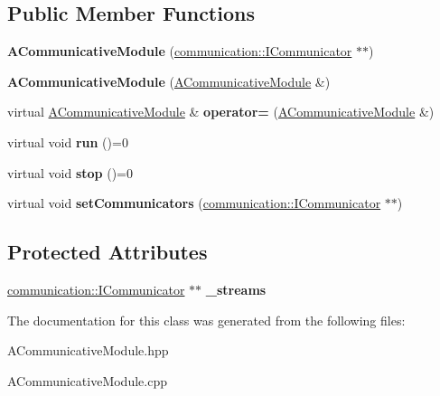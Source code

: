 \subsection*{Public Member Functions}
\begin{DoxyCompactItemize}
\item 
\mbox{\label{classwood_box_1_1module_1_1_a_communicative_module_a070c3d909948d9701f7f4fcede2b0c52}} 
{\bfseries A\+Communicative\+Module} (\mbox{\hyperlink{classwood_box_1_1communication_1_1_i_communicator}{communication\+::\+I\+Communicator}} $\ast$$\ast$)
\item 
\mbox{\label{classwood_box_1_1module_1_1_a_communicative_module_af7d03d4e9ea7322b966af682f6106fd6}} 
{\bfseries A\+Communicative\+Module} (\mbox{\hyperlink{classwood_box_1_1module_1_1_a_communicative_module}{A\+Communicative\+Module}} \&)
\item 
\mbox{\label{classwood_box_1_1module_1_1_a_communicative_module_a2096b6a0f266d939000eb94b1b7275e3}} 
virtual \mbox{\hyperlink{classwood_box_1_1module_1_1_a_communicative_module}{A\+Communicative\+Module}} \& {\bfseries operator=} (\mbox{\hyperlink{classwood_box_1_1module_1_1_a_communicative_module}{A\+Communicative\+Module}} \&)
\item 
\mbox{\label{classwood_box_1_1module_1_1_a_communicative_module_afe8f1f438d36069c84818c7c2803266d}} 
virtual void {\bfseries run} ()=0
\item 
\mbox{\label{classwood_box_1_1module_1_1_a_communicative_module_aaedcc9c9798b58a7aed8cf615404ef31}} 
virtual void {\bfseries stop} ()=0
\item 
\mbox{\label{classwood_box_1_1module_1_1_a_communicative_module_a78a8ab8058a256c2dbccf2762dde10f7}} 
virtual void {\bfseries set\+Communicators} (\mbox{\hyperlink{classwood_box_1_1communication_1_1_i_communicator}{communication\+::\+I\+Communicator}} $\ast$$\ast$)
\end{DoxyCompactItemize}
\subsection*{Protected Attributes}
\begin{DoxyCompactItemize}
\item 
\mbox{\label{classwood_box_1_1module_1_1_a_communicative_module_a4bd6e2a941c299e7040a14bb291b6361}} 
\mbox{\hyperlink{classwood_box_1_1communication_1_1_i_communicator}{communication\+::\+I\+Communicator}} $\ast$$\ast$ {\bfseries \+\_\+streams}
\end{DoxyCompactItemize}


The documentation for this class was generated from the following files\+:\begin{DoxyCompactItemize}
\item 
A\+Communicative\+Module.\+hpp\item 
A\+Communicative\+Module.\+cpp\end{DoxyCompactItemize}
